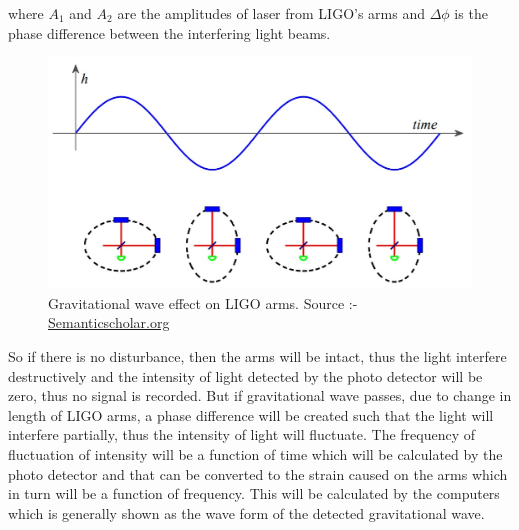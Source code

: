 where $A_1$ and $A_2$ are the amplitudes of laser from LIGO's arms and $\Delta \phi$ is the phase difference between the interfering light beams. 

\begin{figure}[h]
    \centering
    \includegraphics[scale =0.6]{images.tex/GW effect on LIGO arm.jpg}
    \caption{Gravitational wave effect on LIGO arms. Source :- \href{https://www.semanticscholar.org/paper/Broadband-Measurement-and-Reduction-of-Quantum-in-Cripe/ffe14b1a34d504599fa81c817bbb9aef5385c06c}{Semanticscholar.org} \cite{Cripe2020BroadbandMA}}
\end{figure}

So if there is no disturbance, then the arms will be intact, thus the light interfere destructively and the intensity of light detected by the photo detector will be zero, thus no signal is recorded. But if gravitational wave passes, due to change in length of LIGO arms, a phase difference will be created such that the light will interfere partially, thus the intensity of light will fluctuate. The frequency of fluctuation of intensity will be a function of time which will be calculated by the photo detector and that can be converted to the strain caused on the arms which in turn will be a function of frequency. This will be calculated by the computers which is generally shown as the wave form of the detected gravitational wave. 

